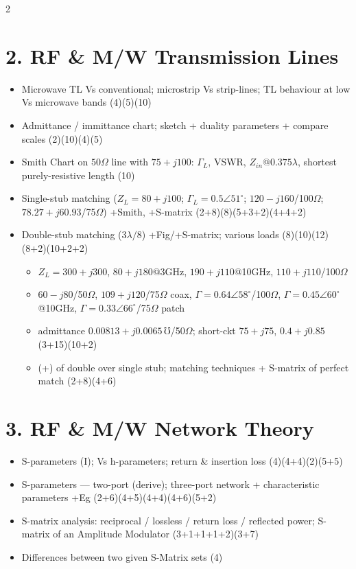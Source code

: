 \documentclass[10pt]{article}
\begin{document}
\begin{multicols}{2}
\section*{2. RF \& M/W Transmission Lines}
\begin{itemize}
  \item Microwave TL Vs conventional; microstrip Vs strip-lines; TL behaviour at low Vs microwave bands \hfill (4)(5)(10)
  \item Admittance / immittance chart; sketch + duality parameters + compare scales \hfill (2)(10)(4)(5)
  \item Smith Chart on $50\Omega$ line with $75{+}j100$: $\Gamma_L$, VSWR, $Z_{in}$@$0.375\lambda$, shortest purely-resistive length \hfill (10)
  \item Single-stub matching ($Z_L{=}80{+}j100$; $\Gamma_L{=}0.5\angle51^\circ$; $120{-}j160$/100$\Omega$; $78.27{+}j60.93$/75$\Omega$) +Smith, +S-matrix \hfill (2+8)(8)(5+3+2)(4+4+2)
  \item Double-stub matching ($3\lambda/8$) +Fig/+S-matrix; various loads \hfill (8)(10)(12)(8+2)(10+2+2)
    \begin{itemize}
      \item $Z_L{=}300{+}j300$, $80{+}j180$@3GHz, $190{+}j110$@10GHz, $110{+}j110$/100$\Omega$
      \item $60{-}j80$/50$\Omega$, $109{+}j120$/75$\Omega$ coax, $\Gamma{=}0.64\angle58^\circ$/100$\Omega$, $\Gamma{=}0.45\angle60^\circ$@10GHz, $\Gamma{=}0.33\angle66^\circ$/75$\Omega$ patch
      \item admittance $0.00813{+}j0.0065\,\mho$/50$\Omega$; short-ckt $75{+}j75$, $0.4{+}j0.85$ \hfill (3+15)(10+2)
      \item (+) of double over single stub; matching techniques + S-matrix of perfect match \hfill (2+8)(4+6)
    \end{itemize}
\end{itemize}

\section*{3. RF \& M/W Network Theory}
\begin{itemize}
  \item S-parameters (I); Vs h-parameters; return \& insertion loss \hfill (4)(4+4)(2)(5+5)
  \item S-parameters --- two-port (derive); three-port network + characteristic parameters +Eg \hfill (2+6)(4+5)(4+4)(4+6)(5+2)
  \item S-matrix analysis: reciprocal / lossless / return loss / reflected power; S-matrix of an Amplitude Modulator \hfill (3+1+1+1+2)(3+7)
  \item Differences between two given S-Matrix sets \hfill (4)
\end{itemize}


\end{multicols}
\end{document}
